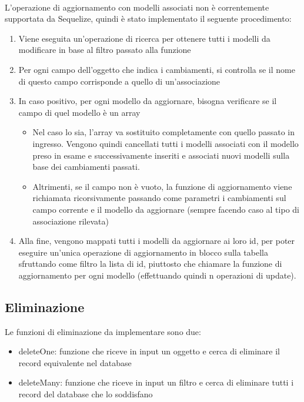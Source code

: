 \documentclass[a4paper, 12pt]{report}
\begin{document}
      \paragraph*{}
      L'operazione di aggiornamento con modelli associati non è correntemente supportata da Sequelize, quindi è stato implementato il seguente procedimento:
      \begin{enumerate}
        \item Viene eseguita un'operazione di ricerca per ottenere tutti i modelli da modificare in base al filtro passato alla funzione
        \item Per ogni campo dell'oggetto che indica i cambiamenti, si controlla se il nome di questo campo corrisponde a quello di un'associazione
        \item In caso positivo, per ogni modello da aggiornare, bisogna verificare se il campo di quel modello è un array
        \begin{itemize}
          \item Nel caso lo sia, l'array va sostituito completamente con quello passato in ingresso. Vengono quindi cancellati tutti i modelli associati con il modello preso in esame e
          successivamente inseriti e associati nuovi modelli sulla base dei cambiamenti passati.
          \item Altrimenti, se il campo non è vuoto, la funzione di aggiornamento viene richiamata ricorsivamente passando come parametri i cambiamenti sul campo corrente e il modello da aggiornare (sempre facendo caso al tipo di associazione rilevata)
        \end{itemize}
        \item Alla fine, vengono mappati tutti i modelli da aggiornare ai loro id, per poter eseguire un'unica operazione di aggiornamento in blocco sulla tabella sfruttando come filtro la lista di id, piuttosto che chiamare la funzione di aggiornamento per ogni modello (effettuando quindi n operazioni di update).
      \end{enumerate}
    \subsection{Eliminazione}
      Le funzioni di eliminazione da implementare sono due:
      \begin{itemize}
        \item deleteOne: funzione che riceve in input un oggetto e cerca di eliminare il record equivalente nel database
        \item deleteMany: funzione che riceve in input un filtro e cerca di eliminare tutti i record del database che lo soddisfano
      \end{itemize}
\end{document}
